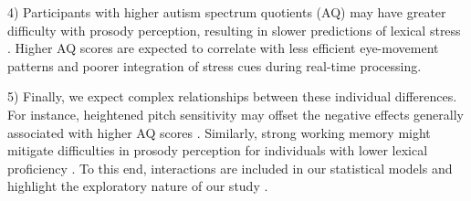 4) Participants with higher autism spectrum quotients (AQ) may have greater difficulty with prosody perception, resulting in slower predictions of lexical stress \citep{schelinski2020speech, grossman2023relationship}. Higher AQ scores are expected to correlate with less efficient eye-movement patterns and poorer integration of stress cues during real-time processing.

5) Finally, we expect complex relationships between these individual differences. For instance, heightened pitch sensitivity may offset the negative effects generally associated with higher AQ scores \citep{Liu2018}. Similarly, strong working memory might mitigate difficulties in prosody perception for individuals with lower lexical proficiency \citep{Huettig2016}. To this end, interactions are included in our statistical models and highlight the exploratory nature of our study \cite{Yanai2020}.